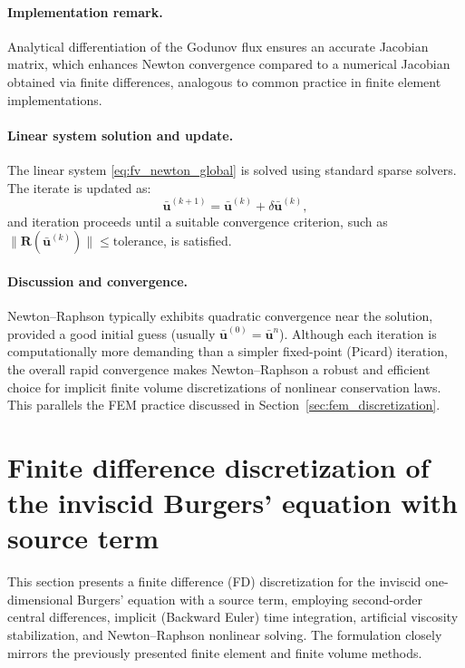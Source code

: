 \paragraph{Implementation remark.}
Analytical differentiation of the Godunov flux ensures an accurate Jacobian matrix, which enhances Newton convergence compared to a numerical Jacobian obtained via finite differences, analogous to common practice in finite element implementations.

\paragraph{Linear system solution and update.}
The linear system \eqref{eq:fv_newton_global} is solved using standard sparse solvers. The iterate is updated as:
\begin{equation}
\bar{\mathbf{u}}^{(k+1)}
=\bar{\mathbf{u}}^{(k)}+\delta\bar{\mathbf{u}}^{(k)},
\end{equation}
and iteration proceeds until a suitable convergence criterion, such as \(\|\mathbf{R}(\bar{\mathbf{u}}^{(k)})\|\leq\text{tolerance}\), is satisfied.

\paragraph{Discussion and convergence.}
Newton--Raphson typically exhibits quadratic convergence near the solution, provided a good initial guess (usually \(\bar{\mathbf{u}}^{(0)}=\bar{\mathbf{u}}^{n}\)). Although each iteration is computationally more demanding than a simpler fixed-point (Picard) iteration, the overall rapid convergence makes Newton--Raphson a robust and efficient choice for implicit finite volume discretizations of nonlinear conservation laws. This parallels the FEM practice discussed in Section~\ref{sec:fem_discretization}.

\section{Finite difference discretization of the inviscid Burgers' equation with source term}
\label{appendix:fd_burgers}

This section presents a finite difference (FD) discretization for the inviscid one-dimensional Burgers' equation with a source term, employing second-order central differences, implicit (Backward Euler) time integration, artificial viscosity stabilization, and Newton--Raphson nonlinear solving. The formulation closely mirrors the previously presented finite element and finite volume methods.


